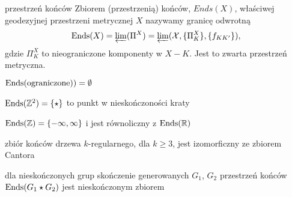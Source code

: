 \begin{definition}{przestrzeń końców}{}
  Zbiorem (przestrzenią) końców, $Ends(X)$, właściwej geodezyjnej przestrzeni metrycznej $X$ nazywamy granicę odwrotną
  $$\operatorname{Ends}(X)=\varprojlim(\Pi^X)=\varprojlim(\mathcal{X}, \{\Pi_K^X\}, \{f_{KK'}\}),$$
  gdzie $\Pi_K^X$ to nieograniczone komponenty w $X-K$.  Jest to zwarta przestrzeń metryczna.
\end{definition}

\begin{example}[m]
  \item $\operatorname{Ends}(\text{ograniczone}))=\emptyset$
  \item $\operatorname{Ends}(\mathbb{Z}^2)=\{\star\}$ to punkt w nieskończoności kraty
  \item $\operatorname{Ends}(\mathbb{Z})=\{-\infty, \infty\}$ i jest równoliczny z $\operatorname{Ends}(\mathbb{R})$
  \item zbiór końców drzewa $k$-regularnego, dla $k\geq 3$, jest izomorficzny ze zbiorem Cantora
  \item dla nieskończonych grup skończenie generowanych $G_1$, $G_2$ przestrzeń końców $\operatorname{Ends}(G_1\star G_2)$ jest nieskończonym zbiorem
\end{example}


